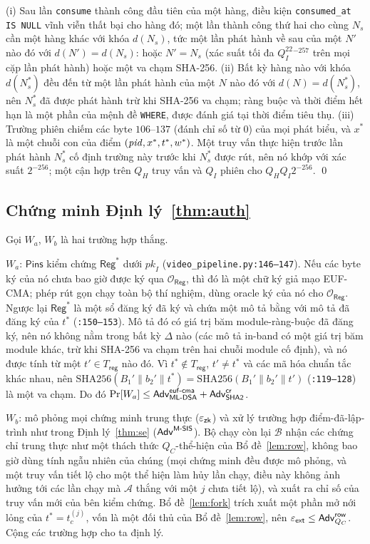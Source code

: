 (i) Sau lần \texttt{consume} thành công đầu tiên của một hàng, điều kiện
\texttt{consumed\_at IS NULL} vĩnh viễn thất bại cho hàng đó; một lần thành
công thứ hai cho cùng $N_s$ cần một hàng khác với khóa $d(N_s)$, tức một lần
phát hành về sau của một $N'$ nào đó với $d(N')=d(N_s)$: hoặc $N'=N_s$ (xác
suất tối đa $Q_I^22^{-257}$ trên mọi cặp lần phát hành) hoặc một va chạm
SHA-256. (ii) Bất kỳ hàng nào với khóa $d(N_s^*)$ đều đến từ một lần phát hành
của một $N$ nào đó với $d(N)=d(N_s^*)$, nên $N_s^*$ đã được phát hành trừ khi
SHA-256 va chạm; ràng buộc và thời điểm hết hạn là một phần của mệnh đề
\texttt{WHERE}, được đánh giá tại thời điểm tiêu thụ. (iii) Trường phiên chiếm
các byte $106$--$137$ (đánh chỉ số từ 0) của mọi phát biểu, và $x^*$ là một
chuỗi con của điểm $(\mathit{pid},x^*,t^*,w^*)$. Một truy vấn thực hiện trước lần phát
hành $N_s^*$ cố định trường này trước khi $N_s^*$ được rút, nên nó khớp với xác
suất $2^{-256}$; một cận hợp trên $Q_H$ truy vấn và $Q_I$ phiên cho
$Q_HQ_I2^{-256}$. \qed

\subsection{Chứng minh Định lý~\ref{thm:auth}}

Gọi $W_a$, $W_b$ là hai trường hợp thắng.

$W_a$: $\mathsf{Pins}$ kiểm chứng $\mathsf{Reg}^*$ dưới $\mathit{pk}_I$
(\texttt{video\_pipeline.py:146--147}). Nếu các byte ký của nó chưa bao giờ
được ký qua $\mathcal O_{\mathsf{Reg}}$, thì đó là một chữ ký giả mạo EUF-CMA;
phép rút gọn chạy toàn bộ thí nghiệm, dùng oracle ký của nó cho
$\mathcal O_{\mathsf{Reg}}$. Ngược lại $\mathsf{Reg}^*$ là một sổ đăng ký đã ký
và chứa một mô tả bằng với mô tả đã đăng ký của $t^*$
(\texttt{:150--153}). Mô tả đó có giá trị băm module-ràng-buộc đã đăng ký, nên
nó không nằm trong bất kỳ $\Delta$ nào (các mô tả in-band có một giá trị băm
module khác, trừ khi SHA-256 va chạm trên hai chuỗi module cố định), và nó
được tính từ một $t'\in T_{\mathsf{reg}}$ nào đó. Vì $t^*\notin T_{\mathsf{reg}}$,
$t'\neq t^*$ và các mã hóa chuẩn tắc khác nhau, nên
$\mathrm{SHA256}(B_1'\|b_2'\|t^*)=\mathrm{SHA256}(B_1'\|b_2'\|t')$
(\texttt{:119--128}) là một va chạm. Do đó
$\Pr[W_a]\le\mathsf{Adv}^{\mathsf{euf\text{-}cma}}_{\mathsf{ML\text{-}DSA}}+\mathsf{Adv}^{\mathsf{cr}}_{\mathsf{SHA2}}$.

$W_b$: mô phỏng mọi chứng minh trung thực ($\varepsilon_{\mathsf{zk}}$) và xử lý trường hợp
điểm-đã-lập-trình như trong Định lý~\ref{thm:se} ($\mathsf{Adv}^{\textsf{M-SIS}}$). Bộ chạy còn
lại $\mathcal B$ nhận các chứng chỉ trung thực như một thách thức $Q_C$-thể-hiện
của Bổ đề~\ref{lem:row}, không bao giờ dùng tính ngẫu nhiên của chúng (mọi chứng
minh đều được mô phỏng, và một truy vấn tiết lộ cho một thể hiện làm hủy lần
chạy, điều này không ảnh hưởng tới các lần chạy mà $\mathcal A$ thắng với một
$j$ chưa tiết lộ), và xuất ra chỉ số của truy vấn mới của bên kiểm chứng.
Bổ đề~\ref{lem:fork} trích xuất một phần mở nới lỏng của $t^*=t_c^{(j)}$, vốn
là một đối thủ của Bổ đề~\ref{lem:row}, nên
$\varepsilon_{\mathsf{ext}}\le\mathsf{Adv}^{\mathsf{row}}_{Q_C}$. Cộng các trường hợp
cho ta định lý.

